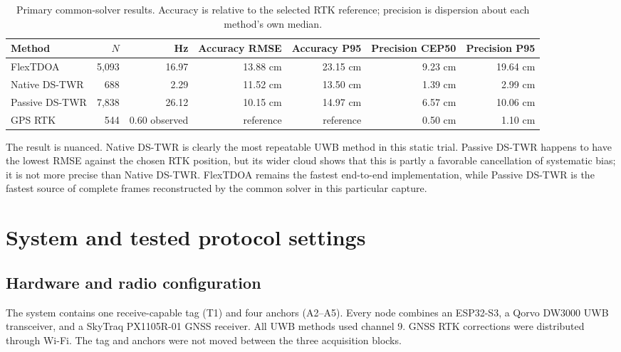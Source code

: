\documentclass[11pt,a4paper]{article}
\newcommand{\native}{\textcolor{nativeblue}{Native DS-TWR}}
\newcommand{\passive}{\textcolor{passivepurple}{Passive DS-TWR}}
\newcommand{\flex}{\textcolor{flexorange}{FlexTDOA}}
\newcommand{\rtk}{\textcolor{rtkgreen}{GPS RTK}}
\begin{document}
\begin{table}[H]
  \centering
  \caption{Primary common-solver results. Accuracy is relative to the selected
  RTK reference; precision is dispersion about each method's own median.}
  \footnotesize
  \setlength{\tabcolsep}{4pt}
  \begin{tabular}{lrrrrrr}
    \toprule
    Method & $N$ & Hz & Accuracy RMSE & Accuracy P95 & Precision CEP50 & Precision P95\\
    \midrule
    \flex{} & 5,093 & 16.97 & 13.88 cm & 23.15 cm & 9.23 cm & 19.64 cm\\
    \native{} & 688 & 2.29 & 11.52 cm & 13.50 cm & 1.39 cm & 2.99 cm\\
    \passive{} & 7,838 & 26.12 & 10.15 cm & 14.97 cm & 6.57 cm & 10.06 cm\\
    \rtk{} & 544 & 0.60 observed & reference & reference & 0.50 cm & 1.10 cm\\
    \bottomrule
  \end{tabular}
\end{table}

The result is nuanced. Native DS-TWR is clearly the most repeatable UWB method
in this static trial. Passive DS-TWR happens to have the lowest RMSE against
the chosen RTK position, but its wider cloud shows that this is partly a
favorable cancellation of systematic bias; it is not more precise than Native
DS-TWR. FlexTDOA remains the fastest end-to-end implementation, while Passive
DS-TWR is the fastest source of complete frames reconstructed by the common
solver in this particular capture.

\section{System and tested protocol settings}

\subsection{Hardware and radio configuration}

The system contains one receive-capable tag (T1) and four anchors (A2--A5).
Every node combines an ESP32-S3, a Qorvo DW3000 UWB transceiver, and a SkyTraq
PX1105R-01 GNSS receiver. All UWB methods used channel 9. GNSS RTK corrections
were distributed through Wi-Fi. The tag and anchors were not moved between the
three acquisition blocks.
\end{document}
